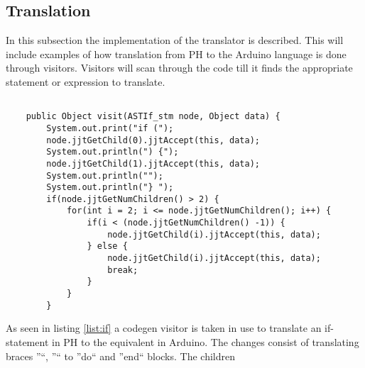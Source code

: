 \subsection{Translation}
In this subsection the implementation of the translator is described. This will include examples of how translation from PH to the Arduino language is done through visitors.
Visitors will scan through the code till it finds the appropriate statement or expression to translate.

\begin{lstlisting}[Caption=Visitor for translation of an if-statement, label=list:if]

	public Object visit(ASTIf_stm node, Object data) {
		System.out.print("if (");
		node.jjtGetChild(0).jjtAccept(this, data);
		System.out.println(") {");
		node.jjtGetChild(1).jjtAccept(this, data);
		System.out.println("");
		System.out.println("} ");
		if(node.jjtGetNumChildren() > 2) {
			for(int i = 2; i <= node.jjtGetNumChildren(); i++) {
				if(i < (node.jjtGetNumChildren() -1)) {
					node.jjtGetChild(i).jjtAccept(this, data);
				} else {
					node.jjtGetChild(i).jjtAccept(this, data);
					break;
				}
			}
		}

\end{lstlisting}

As seen in listing \ref{list:if} a codegen visitor is taken in use to translate an if-statement in PH to the equivalent in Arduino. The changes consist of translating braces ''{``, ''}`` to ''do`` and ''end`` blocks. The children 